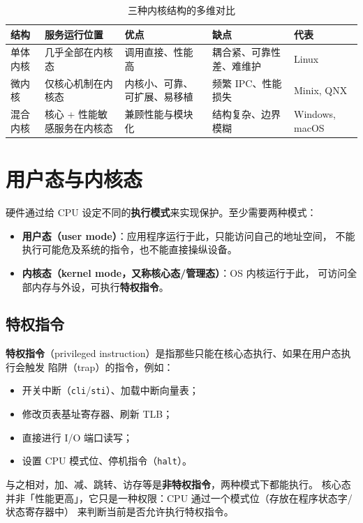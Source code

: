 \begin{table}[H]
\centering
\caption{三种内核结构的多维对比}
\begin{tabulary}{\textwidth}{LLLLL}
\toprule
结构 & 服务运行位置 & 优点 & 缺点 & 代表 \\
\midrule
单体内核 & 几乎全部在内核态 & 调用直接、性能高 & 耦合紧、可靠性差、难维护 & Linux \\
微内核 & 仅核心机制在内核态 & 内核小、可靠、可扩展、易移植 & 频繁 IPC、性能损失 & Minix, QNX \\
混合内核 & 核心 + 性能敏感服务在内核态 & 兼顾性能与模块化 & 结构复杂、边界模糊 & Windows, macOS \\
\bottomrule
\end{tabulary}
\end{table}

\section{用户态与内核态}

硬件通过给 CPU 设定不同的\textbf{执行模式}来实现保护。至少需要两种模式：

\begin{itemize}
    \item \textbf{用户态（user mode）}：应用程序运行于此，只能访问自己的地址空间，
        不能执行可能危及系统的指令，也不能直接操纵设备。
    \item \textbf{内核态（kernel mode，又称核心态/管理态）}：OS 内核运行于此，
        可访问全部内存与外设，可执行\textbf{特权指令}。
\end{itemize}

\subsection{特权指令}

\textbf{特权指令}（privileged instruction）是指那些只能在核心态执行、如果在用户态执行会触发
陷阱（trap）的指令，例如：

\begin{itemize}
    \item 开关中断（\texttt{cli}/\texttt{sti}）、加载中断向量表；
    \item 修改页表基址寄存器、刷新 TLB；
    \item 直接进行 I/O 端口读写；
    \item 设置 CPU 模式位、停机指令（\texttt{halt}）。
\end{itemize}

\noindent 与之相对，加、减、跳转、访存等是\textbf{非特权指令}，两种模式下都能执行。
核心态并非「性能更高」，它只是一种权限：CPU 通过一个模式位（存放在程序状态字/状态寄存器中）
来判断当前是否允许执行特权指令。

